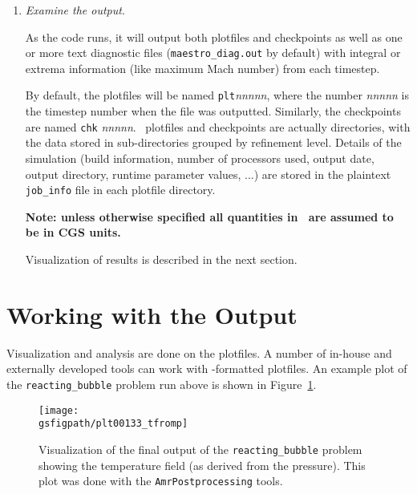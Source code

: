 \begin{enumerate}
\item {\em Examine the output}.

As the code runs, it will output both plotfiles and checkpoints as
well as one or more text diagnostic files ({\tt maestro\_diag.out} by
default) with integral or extrema information (like maximum Mach
number) from each timestep.

By default, the plotfiles will be named {\tt plt}{\em nnnnn}, where
the number {\em nnnnn} is the timestep number when the file was
outputted.  Similarly, the checkpoints are named {\tt chk}{\em
nnnnn}.  \boxlib\ plotfiles and checkpoints are actually directories,
with the data stored in sub-directories grouped by refinement level.
Details of the simulation (build information, number of processors
used, output date, output directory, runtime parameter values, ...)
are stored in the plaintext {\tt job\_info} file in each plotfile directory.

{\bf Note: unless otherwise specified all quantities in \maestro\ are
assumed to be in CGS units.}

Visualization of results is described in the next section.


\end{enumerate}


\section{Working with the Output}

Visualization and analysis are done on the plotfiles.  A number of
in-house and externally developed tools can work
with \boxlib-formatted plotfiles.  An example plot of the {\tt reacting\_bubble}
problem run above is shown in Figure~\ref{fig:gettingstarted:test2}.

\begin{figure}[t]
\centering
\texttt{[image: \\gsfigpath/plt00133\_tfromp]}
\caption[Visualization of {\tt reacting\_bubble} output]{\label{fig:gettingstarted:test2} Visualization of the
final output of the {\tt reacting\_bubble} problem showing the temperature
field (as derived from the pressure).  This plot was done with
the {\tt AmrPostprocessing} tools.}
\end{figure}



\subsection{\amrvis}

